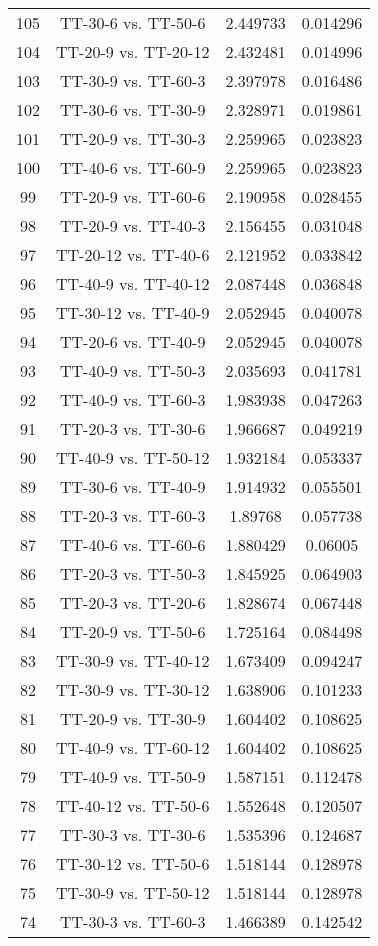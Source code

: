 \documentclass[a4paper,10pt]{article}
\begin{document}
\begin{landscape}
\begin{table}[!htp]
\begin{tabular}{cccc}
105&TT-30-6 vs. TT-50-6&2.449733&0.014296\\
104&TT-20-9 vs. TT-20-12&2.432481&0.014996\\
103&TT-30-9 vs. TT-60-3&2.397978&0.016486\\
102&TT-30-6 vs. TT-30-9&2.328971&0.019861\\
101&TT-20-9 vs. TT-30-3&2.259965&0.023823\\
100&TT-40-6 vs. TT-60-9&2.259965&0.023823\\
99&TT-20-9 vs. TT-60-6&2.190958&0.028455\\
98&TT-20-9 vs. TT-40-3&2.156455&0.031048\\
97&TT-20-12 vs. TT-40-6&2.121952&0.033842\\
96&TT-40-9 vs. TT-40-12&2.087448&0.036848\\
95&TT-30-12 vs. TT-40-9&2.052945&0.040078\\
94&TT-20-6 vs. TT-40-9&2.052945&0.040078\\
93&TT-40-9 vs. TT-50-3&2.035693&0.041781\\
92&TT-40-9 vs. TT-60-3&1.983938&0.047263\\
91&TT-20-3 vs. TT-30-6&1.966687&0.049219\\
90&TT-40-9 vs. TT-50-12&1.932184&0.053337\\
89&TT-30-6 vs. TT-40-9&1.914932&0.055501\\
88&TT-20-3 vs. TT-60-3&1.89768&0.057738\\
87&TT-40-6 vs. TT-60-6&1.880429&0.06005\\
86&TT-20-3 vs. TT-50-3&1.845925&0.064903\\
85&TT-20-3 vs. TT-20-6&1.828674&0.067448\\
84&TT-20-9 vs. TT-50-6&1.725164&0.084498\\
83&TT-30-9 vs. TT-40-12&1.673409&0.094247\\
82&TT-30-9 vs. TT-30-12&1.638906&0.101233\\
81&TT-20-9 vs. TT-30-9&1.604402&0.108625\\
80&TT-40-9 vs. TT-60-12&1.604402&0.108625\\
79&TT-40-9 vs. TT-50-9&1.587151&0.112478\\
78&TT-40-12 vs. TT-50-6&1.552648&0.120507\\
77&TT-30-3 vs. TT-30-6&1.535396&0.124687\\
76&TT-30-12 vs. TT-50-6&1.518144&0.128978\\
75&TT-30-9 vs. TT-50-12&1.518144&0.128978\\
74&TT-30-3 vs. TT-60-3&1.466389&0.142542\\

\end{tabular}
\end{table}
\end{landscape}
\end{document}
